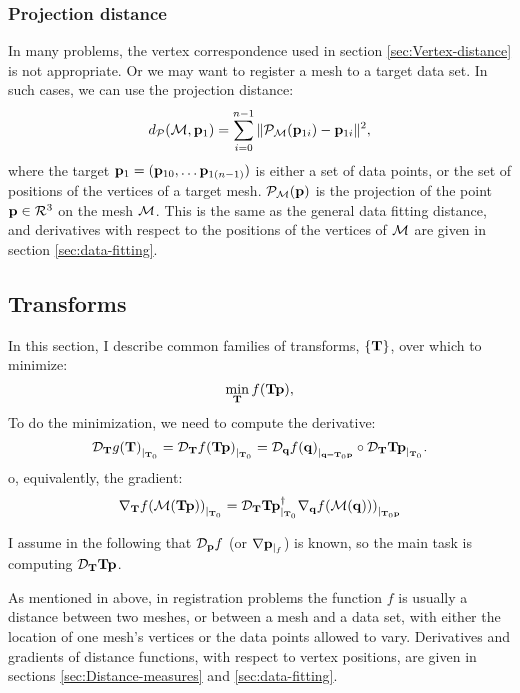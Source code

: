 \subsubsection{Projection distance}
\label{sec:Projection-distance}

In many problems, the vertex correspondence used in
section \ref{sec:Vertex-distance} is not appropriate.
Or we may want to register a mesh to a target data set.
In such cases, we can use the projection distance:
\begin{equation}
d_{{\mathcal P}}({\mathcal M},{\mathbf p}_1) = \sum_{i=0}^{n-1} \| {\mathcal P}_{{\mathcal M}}({\mathbf p}_{1i}) - {\mathbf p}_{1i} \|^2,
\end{equation}
where the target ${\mathbf p}_1 = ({\mathbf p}_{10}, \ldots {\mathbf p}_{1(n-1)})$
is either a set of data points,
or the set of positions of the vertices of a target mesh.
${\mathcal P}_{{\mathcal M}}({\mathbf p})$ is the projection of the point ${\mathbf p} \in \mathcal{R}^3$
on the mesh ${\mathcal M}$.
This is the same as the general data fitting distance, and
derivatives with respect to the positions of the vertices
of ${\mathcal M}$ are given in section \ref{sec:data-fitting}.

\subsection{Transforms}
\label{sec:Transforms}

In this section, I describe common families
of transforms, $\{{\mathbf T}\}$, over which to minimize:
\begin{equation}
\min_{{\mathbf T}} f( {\mathbf T} {\mathbf p}),
\end{equation}
To do the minimization, we need to compute
the derivative:
\begin{equation}
{\mathcal D}_{{\mathbf T}}{g({\mathbf T})}_{\mid_{{\mathbf T}_0}}
= {\mathcal D}_{{\mathbf T}}{f({\mathbf T}{\mathbf p})}_{\mid_{{\mathbf T}_0}}
= {\mathcal D}_{{\mathbf q}}{f({\mathbf q})}_{\mid_{{\mathbf q}={\mathbf T}_0{\mathbf p}}}
\circ
{\mathcal D}_{{\mathbf T}}{{\mathbf T}{\mathbf p}}_{\mid_{{\mathbf T}_0}}.
\end{equation}
o, equivalently, the gradient:
\begin{equation}
{\mathbf \nabla}_{{\mathbf T}}{{f( {\mathcal M}({\mathbf T}{\mathbf p}) )}}_{\mid_{{\mathbf T}_0}}
 =
{\mathcal D}_{{\mathbf T}}{{\mathbf T}{\mathbf p}}_{\mid_{{\mathbf T}_0}}^\dagger
{\mathbf \nabla}_{{\mathbf q}}{{f({\mathcal M}({\mathbf q})))}}_{\mid_{{\mathbf T}_0{\mathbf p}}}
\end{equation}

I assume in the following
that ${\mathcal D}_{{\mathbf p}}{f}$ (or ${\mathbf \nabla}{{\mathbf p}}_{\mid_{f}}$) is known,
so the main task is computing ${\mathcal D}_{{\mathbf T}}{{\mathbf T}{\mathbf p}}$.

As mentioned in above,
in registration problems
the function $f$ is usually a distance between
two meshes, or between a mesh and a data set,
with either the location of one mesh's vertices
or the data points allowed to vary.
Derivatives and gradients of distance functions,
with respect to vertex positions,
are given in sections \ref{sec:Distance-measures}
and \ref{sec:data-fitting}.

